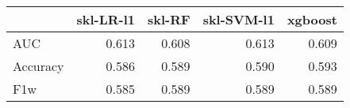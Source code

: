 \begin{tabular}{lrrrr}
\toprule
{} &  skl-LR-l1 &  skl-RF &  skl-SVM-l1 &  xgboost \\
\midrule
AUC      &      0.613 &   0.608 &       0.613 &    0.609 \\
Accuracy &      0.586 &   0.589 &       0.590 &    0.593 \\
F1w      &      0.585 &   0.589 &       0.589 &    0.589 \\
\bottomrule
\end{tabular}
